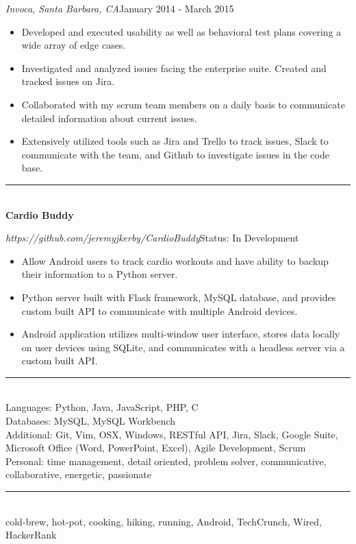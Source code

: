 \documentclass{article}
\begin{document}
\normalsize{
	\textit{Invoca, Santa Barbara, CA}\hspace*{305pt}January 2014 - March 2015\\
	\vspace{-4mm}
		\begin{itemize}
			\item Developed and executed usability as well as behavioral test plans covering a wide array of edge cases.
			\item Investigated and analyzed issues facing the enterprise suite. Created and tracked issues on Jira.
			\item Collaborated with my scrum team members on a daily basis to communicate detailed information about current issues.
			\item Extensively utilized tools such as Jira and Trello to track issues, Slack to communicate with the team, and Github to investigate issues in the code base.\\
		\end{itemize}
}


\noindent{}\rule[-2pt]{\textwidth}{.3pt}\\
\noindent\large{\textbf{Cardio Buddy}}\\
\normalsize{
	\textit{https://github.com/jeremyjkerby/CardioBuddy}\hspace*{237pt}Status: In Development\\
	\vspace{-4mm}
		\begin{itemize}
			\item Allow Android users to track cardio workouts and have ability to backup their information to a Python server.
			\item Python server built with Flask framework, MySQL database, and provides custom built API to communicate with multiple Android devices.
  			\item Android application utilizes multi-window user interface, stores data locally on user devices using SQLite, and communicates with a headless server via a custom built API.\\
		\end{itemize}
}


\noindent{}\rule[-2pt]{\textwidth}{.3pt}\\
\normalsize{
	Languages: Python, Java, JavaScript, PHP, C\\
	Databases: MySQL, MySQL Workbench\\
	Additional: Git, Vim, OSX, Windows, RESTful API, Jira, Slack, Google Suite, Microsoft Office (Word, PowerPoint, Excel), Agile Development, Scrum\\
	Personal: time management, detail oriented, problem solver, communicative, collaborative, energetic, passionate\\
}


\noindent{}\rule[-2pt]{\textwidth}{.3pt}\\
\normalsize{cold-brew, hot-pot, cooking, hiking, running, Android, TechCrunch, Wired, HackerRank}
\end{document}
